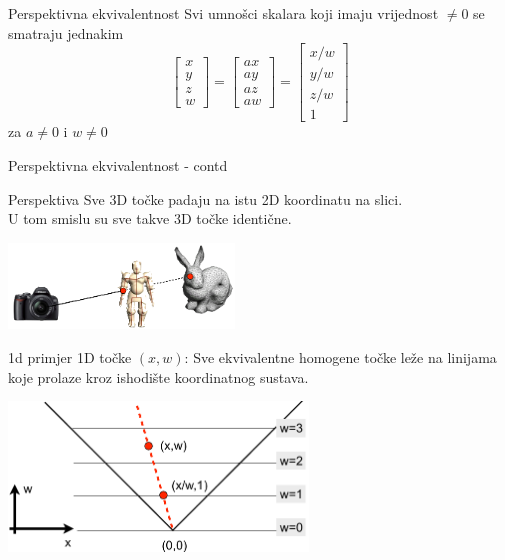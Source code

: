 \documentclass[9pt]{beamer}
\begin{document}
\begin{frame}{Perspektivna ekvivalentnost}
	Svi umnošci skalara koji imaju vrijednost $\neq 0 $ se smatraju jednakim
	\begin{equation}
	\left[ \begin{array}{c}
	x \\ y \\ z\\ w\end{array} \right]  = 
	\left[ \begin{array}{c}
	ax \\ ay \\ az\\ aw\end{array} \right] = 
	\left[ \begin{array}{c}
	x/w \\ y/w \\ z/w\\ 1\end{array} \right] \nonumber
	\end{equation}
	za $ a\neq 0 $ i $ w\neq 0 $
\end{frame}

\begin{frame}{Perspektivna ekvivalentnost - contd}
	
	\begin{block}{Perspektiva}
		Sve 3D točke padaju na istu 2D koordinatu na slici.\\
		U tom smislu su sve takve 3D točke identične.
	\end{block}
	\begin{center}
		\includegraphics[width=6cm]{slike/homogenekoo_eqv.png}
	\end{center}
\end{frame}

\begin{frame}{1d primjer}
	1D točke $(x,w)$: Sve ekvivalentne homogene točke leže na linijama koje prolaze kroz ishodište koordinatnog sustava.
	\begin{center}
		\includegraphics[height=4cm]{slike/homogenekoo_1d.png}
	\end{center}
\end{frame}
\end{document}
